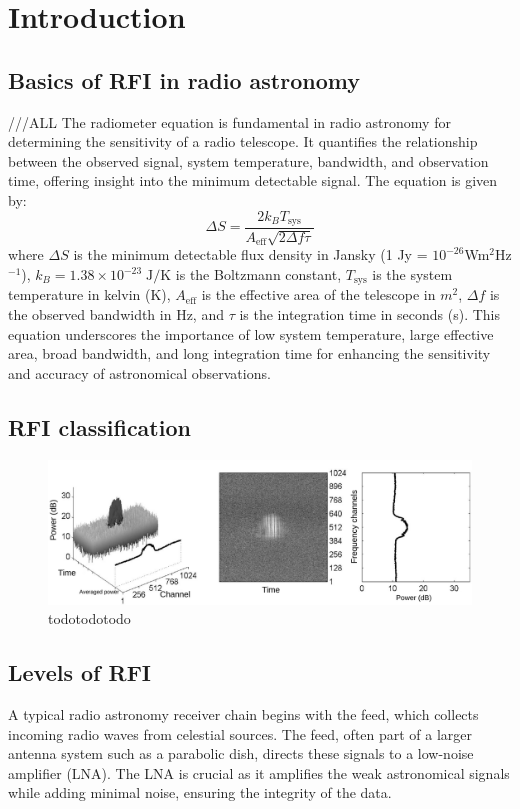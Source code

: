 \section{Introduction}
\label{section:hardware:introduction}

\subsection{Basics of RFI in radio astronomy} ///ALL
The radiometer equation is fundamental in radio astronomy for determining the sensitivity of a radio telescope. It quantifies the relationship between the observed signal, system temperature, bandwidth, and observation time, offering insight into the minimum detectable signal. The equation is given by:
\[ \Delta S = \frac{2 k_B T_{\text{sys}}}{A_{\text{eff}} \sqrt{2 \Delta f \tau}} \]
where \( \Delta S \) is the minimum detectable flux density in Jansky (1 Jy = $10^{-26}$Wm$^2$Hz$^{-1}$), \( k_B =1.38 \times 10^{-23} \;\text{J} / \text{K}\) is the Boltzmann constant, \( T_{\text{sys}} \) is the system temperature in kelvin (K), \( A_{\text{eff}} \) is the effective area of the telescope in $m^2$, \( \Delta f \) is the observed bandwidth in Hz, and \( \tau \) is the integration time in seconds (s). This equation underscores the importance of low system temperature, large effective area, broad bandwidth, and long integration time for enhancing the sensitivity and accuracy of astronomical observations.

\subsection{RFI classification}
\label{subsection:hardware:introduction:classification}

\begin{figure}
    \centering
    \includegraphics[height=.20\textheight]{figures/radar.pdf}
    \caption{todotodotodo}
    \label{fig:rfi_example_radar}
\end{figure}

\subsection{Levels of RFI}
\label{subsection:hardware:introduction:levels}
A typical radio astronomy receiver chain begins with the feed, which collects incoming radio waves from celestial sources. The feed, often part of a larger antenna system such as a parabolic dish, directs these signals to a low-noise amplifier (LNA). The LNA is crucial as it amplifies the weak astronomical signals while adding minimal noise, ensuring the integrity of the data.

